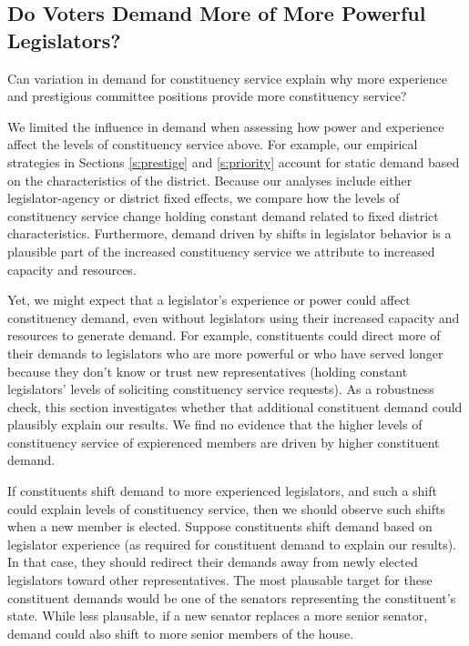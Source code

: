 \documentclass[12pt]{article}
\begin{document}

\subsection{Do Voters Demand More of More Powerful Legislators?}

Can variation in demand for constituency service explain why more experience and prestigious committee positions provide more constituency service? 

We limited the influence in demand when assessing how power and experience affect the levels of constituency service above. For example, our empirical strategies in Sections \ref{s:prestige}%
and \ref{s:priority} account for static demand based on the characteristics of the district. %
Because our analyses include either legislator-agency or district fixed effects, we compare how the levels of constituency service change holding constant demand related to fixed district characteristics. Furthermore, %
demand driven by shifts in legislator behavior is a plausible part of the increased constituency service we attribute to increased capacity and resources.

Yet, we might expect that a legislator's experience or power could affect constituency demand, even without legislators using their increased capacity and resources to generate demand. %
For example, constituents could direct more of their demands to legislators who are more powerful or who have served longer because they don't know or trust new representatives (holding constant legislators' levels of soliciting constituency service requests). As a robustness check, this section investigates whether that additional constituent demand could plausibly explain our results. We find no evidence that the higher levels of constituency service of expierenced members are driven by higher constituent demand. 

If constituents shift demand to more experienced legislators, and such a shift could explain levels of constituency service, then we should observe such shifts when a new member is elected. Suppose constituents shift demand based on legislator experience (as required for constituent demand to explain our results). In that case, they should redirect their demands away from newly elected legislators toward other representatives. The most plausable target for these constituent demands would be one of the senators representing the constituent's state. While less plausable, if a new senator replaces a more senior senator, demand could also shift to more senior members of the house.
\end{document}
